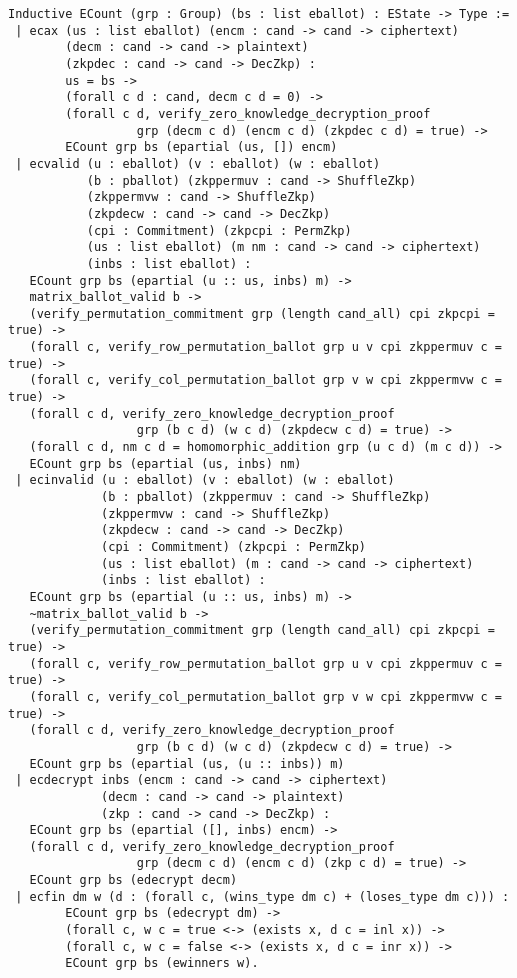 \documentclass{llncs}
\begin{document}
\begin{verbatim}
Inductive ECount (grp : Group) (bs : list eballot) : EState -> Type :=
 | ecax (us : list eballot) (encm : cand -> cand -> ciphertext)
        (decm : cand -> cand -> plaintext)
        (zkpdec : cand -> cand -> DecZkp) :
        us = bs ->
        (forall c d : cand, decm c d = 0) -> 
        (forall c d, verify_zero_knowledge_decryption_proof 
                  grp (decm c d) (encm c d) (zkpdec c d) = true) ->
        ECount grp bs (epartial (us, []) encm)
 | ecvalid (u : eballot) (v : eballot) (w : eballot)
           (b : pballot) (zkppermuv : cand -> ShuffleZkp)
           (zkppermvw : cand -> ShuffleZkp) 
           (zkpdecw : cand -> cand -> DecZkp)
           (cpi : Commitment) (zkpcpi : PermZkp)
           (us : list eballot) (m nm : cand -> cand -> ciphertext)
           (inbs : list eballot) :
   ECount grp bs (epartial (u :: us, inbs) m) ->
   matrix_ballot_valid b ->
   (verify_permutation_commitment grp (length cand_all) cpi zkpcpi = true) ->
   (forall c, verify_row_permutation_ballot grp u v cpi zkppermuv c = true) ->
   (forall c, verify_col_permutation_ballot grp v w cpi zkppermvw c = true) ->
   (forall c d, verify_zero_knowledge_decryption_proof 
                  grp (b c d) (w c d) (zkpdecw c d) = true) ->
   (forall c d, nm c d = homomorphic_addition grp (u c d) (m c d)) -> 
   ECount grp bs (epartial (us, inbs) nm)
 | ecinvalid (u : eballot) (v : eballot) (w : eballot)
             (b : pballot) (zkppermuv : cand -> ShuffleZkp)
             (zkppermvw : cand -> ShuffleZkp) 
             (zkpdecw : cand -> cand -> DecZkp)
             (cpi : Commitment) (zkpcpi : PermZkp)
             (us : list eballot) (m : cand -> cand -> ciphertext)
             (inbs : list eballot) :
   ECount grp bs (epartial (u :: us, inbs) m) ->
   ~matrix_ballot_valid b ->
   (verify_permutation_commitment grp (length cand_all) cpi zkpcpi = true) ->
   (forall c, verify_row_permutation_ballot grp u v cpi zkppermuv c = true) ->
   (forall c, verify_col_permutation_ballot grp v w cpi zkppermvw c = true) ->
   (forall c d, verify_zero_knowledge_decryption_proof 
                  grp (b c d) (w c d) (zkpdecw c d) = true) ->
   ECount grp bs (epartial (us, (u :: inbs)) m)
 | ecdecrypt inbs (encm : cand -> cand -> ciphertext)
             (decm : cand -> cand -> plaintext)
             (zkp : cand -> cand -> DecZkp) :
   ECount grp bs (epartial ([], inbs) encm) ->
   (forall c d, verify_zero_knowledge_decryption_proof
                  grp (decm c d) (encm c d) (zkp c d) = true) ->
   ECount grp bs (edecrypt decm)
 | ecfin dm w (d : (forall c, (wins_type dm c) + (loses_type dm c))) :
        ECount grp bs (edecrypt dm) ->
        (forall c, w c = true <-> (exists x, d c = inl x)) ->
        (forall c, w c = false <-> (exists x, d c = inr x)) ->
        ECount grp bs (ewinners w). 
\end{verbatim}
 
\end{document}
